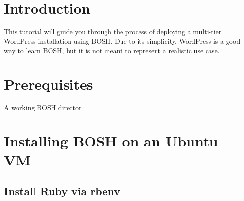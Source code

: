 
\def\mytitle{BOSH Tutorial}
\def\myauthor{VMware 2012 - Cloud Foundry}
\def\latexmode{memoir}

\chapter{Introduction}
\label{introduction}

This tutorial will guide you through the process of deploying a multi-tier WordPress installation using BOSH. Due to its simplicity, WordPress is a good way to learn BOSH, but it is not meant to represent a realistic use case.

\chapter{Prerequisites}
\label{prerequisites}

A working BOSH director

\chapter{Installing BOSH on an Ubuntu VM}
\label{installingboshonanubuntuvm}

\section{Install Ruby via rbenv}
\label{installrubyviarbenv}

